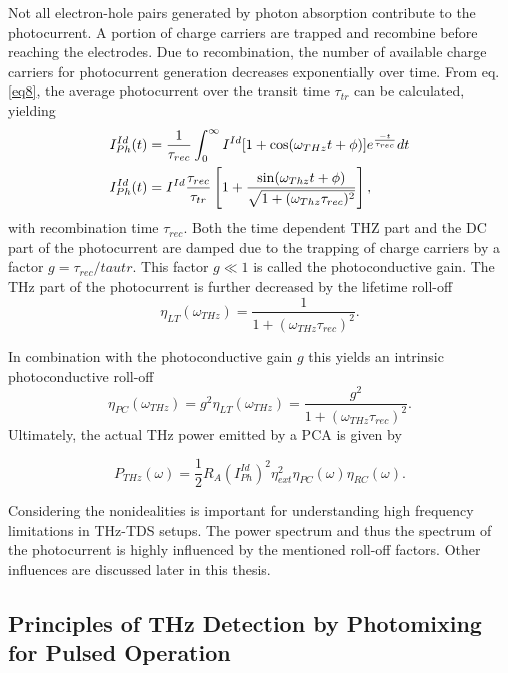 Not all electron-hole pairs generated by photon absorption contribute to the photocurrent. A portion of charge carriers are trapped and recombine before reaching the electrodes. Due to recombination, the number of available charge carriers for photocurrent generation decreases exponentially over time. From eq. \eqref{eq8}, the average photocurrent over the transit time $\tau_{tr}$ can be calculated, yielding
\begin{align}
	I_{Ph}^{Id}(t) &= \frac{1}{\tau_{rec}} \int_{0}^{\infty} I^{Id}[1 + \cos(\omega_{THz}t + \phi)]e^{\frac{-t}{\tau_{rec}}}dt \notag \\
	I_{Ph}^{Id}(t) &=  I^{Id}\frac{\tau_{rec}}{\tau_{tr}}\left[
		1 + \frac{\sin(\omega_{Thz}t + \phi)}{\sqrt{1 + (\omega_{Thz} \tau_{rec})^2}}
	\right],
\end{align}
with recombination time $\tau_{rec}$. Both the time dependent THZ part and the DC part of the photocurrent are damped due to the trapping of charge carriers by a factor $g = \tau_{rec} /tau{tr}$. This factor $g \ll 1$ is called the photoconductive gain. The THz part of the photocurrent is further decreased by the lifetime roll-off 
\begin{equation}
	\eta_{LT}(\omega_{THz}) = \frac{1}{1 + (\omega_{THz}\tau_{rec})^2}.
\end{equation}

In combination with the photoconductive gain $g$ this yields an intrinsic photoconductive roll-off
\begin{equation}
	\eta_{PC}(\omega_{THz}) = g^2\eta_{LT}(\omega_{THz}) = \frac{g^2}{1 + (\omega_{THz}\tau_{rec})^2}.
\end{equation}
Ultimately, the actual THz power emitted by a PCA is given by 

\begin{equation}
    P_{THz}(\omega) = \frac{1}{2}R_A(I_{Ph}^{Id})^2\eta_{ext}^2\eta_{PC}(\omega)\eta_{RC}(\omega).
    \label{eq_power}
\end{equation}

Considering the nonidealities is important for understanding high frequency limitations in THz-TDS setups. The power spectrum and thus the spectrum of the photocurrent is highly influenced by the mentioned roll-off factors. Other influences are discussed later in this thesis. 

\subsection{Principles of THz Detection by Photomixing for Pulsed Operation}

